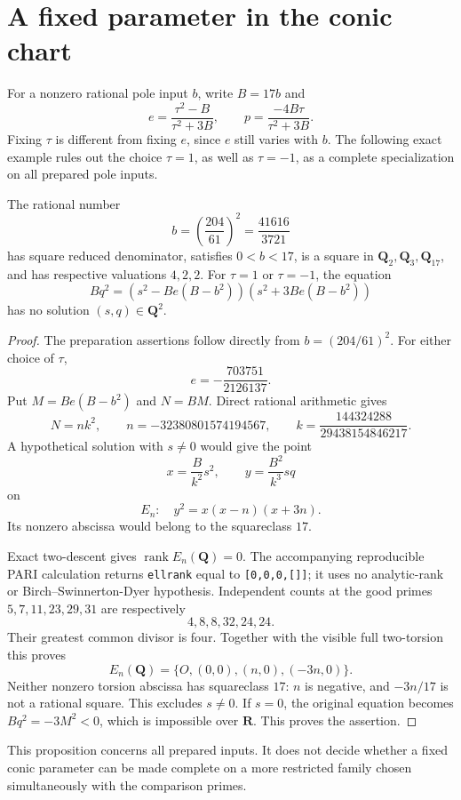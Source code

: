 \section{A fixed parameter in the conic chart}

For a nonzero rational pole input $b$, write $B=17b$ and
\[
 e=\frac{\tau^2-B}{\tau^2+3B},\qquad
 p=\frac{-4B\tau}{\tau^2+3B}.
\]
Fixing $\tau$ is different from fixing $e$, since $e$ still varies with $b$.
The following exact example rules out the choice $\tau=1$, as well as
$\tau=-1$, as a complete specialization on all prepared pole inputs.

\begin{proposition}
The rational number
\[
 b=\left(\frac{204}{61}\right)^2=\frac{41616}{3721}
\]
has square reduced denominator, satisfies $0<b<17$, is a square in
$\mathbf Q_2,\mathbf Q_3,\mathbf Q_{17}$, and has respective valuations
$4,2,2$. For $\tau=1$ or $\tau=-1$, the equation
\[
 Bq^2=(s^2-Be(B-b^2))(s^2+3Be(B-b^2))
\]
has no solution $(s,q)\in\mathbf Q^2$.
\end{proposition}
\begin{proof}
The preparation assertions follow directly from $b=(204/61)^2$.
For either choice of $\tau$,
\[
 e=-\frac{703751}{2126137}.
\]
Put $M=Be(B-b^2)$ and $N=BM$. Direct rational arithmetic gives
\[
 N=nk^2,\qquad
 n=-32380801574194567,\qquad
 k=\frac{144324288}{29438154846217}.
\]
A hypothetical solution with $s\ne0$ would give the point
\[
 x=\frac{B}{k^2}s^2,\qquad y=\frac{B^2}{k^3}sq
\]
on
\[
 E_n:\quad y^2=x(x-n)(x+3n).
\]
Its nonzero abscissa would belong to the squareclass $17$.

Exact two-descent gives $\operatorname{rank}E_n(\mathbf Q)=0$.
The accompanying reproducible PARI calculation returns
\texttt{ellrank} equal to \texttt{[0,0,0,[]]}; it uses no analytic-rank
or Birch--Swinnerton-Dyer hypothesis. Independent counts at the good
primes $5,7,11,23,29,31$ are respectively
\[
                         4,8,8,32,24,24.
\]
Their greatest common divisor is four. Together with the visible full
two-torsion this proves
\[
 E_n(\mathbf Q)=\{O,(0,0),(n,0),(-3n,0)\}.
\]
Neither nonzero torsion abscissa has squareclass $17$: $n$ is negative,
and $-3n/17$ is not a rational square. This excludes $s\ne0$.
If $s=0$, the original equation becomes $Bq^2=-3M^2<0$, which is
impossible over $\mathbf R$. This proves the assertion.
\end{proof}

This proposition concerns all prepared inputs. It does not decide
whether a fixed conic parameter can be made complete on a more
restricted family chosen simultaneously with the comparison primes.
